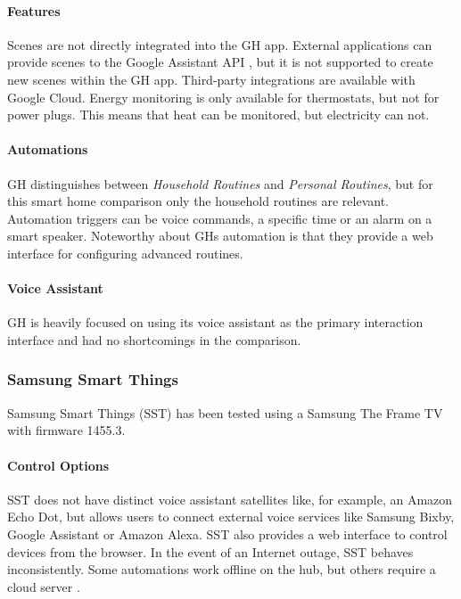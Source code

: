 \paragraph{Features}
Scenes are not directly integrated into the GH app. External applications can provide scenes to the Google Assistant API \cite{GoogleDeveloper2023ScenesGuide}, but it is not supported to create new scenes within the GH app. Third-party integrations are available with Google Cloud. Energy monitoring is only available for thermostats, but not for power plugs. This means that heat can be monitored, but electricity can not.

\paragraph{Automations}
GH distinguishes between \textit{Household Routines} and \textit{Personal Routines}, but for this smart home comparison only the household routines are relevant. Automation triggers can be voice commands, a specific time or an alarm on a smart speaker. Noteworthy about GHs automation is that they provide a web interface for configuring advanced routines.

\paragraph{Voice Assistant}
GH is heavily focused on using its voice assistant as the primary interaction interface and had no shortcomings in the comparison.

\newpage
\subsubsection{Samsung Smart Things}
Samsung Smart Things (SST) has been tested using a Samsung The Frame TV with firmware 1455.3.

\paragraph{Control Options}
SST does not have distinct voice assistant satellites like, for example, an Amazon Echo Dot, but allows users to connect external voice services like Samsung Bixby, Google Assistant or Amazon Alexa. SST also provides a web interface to control devices from the browser. In the event of an Internet outage, SST behaves inconsistently. Some automations work offline on the hub, but others require a cloud server \cite{Reddit_r/SmartThings2024OfflineMode}.

